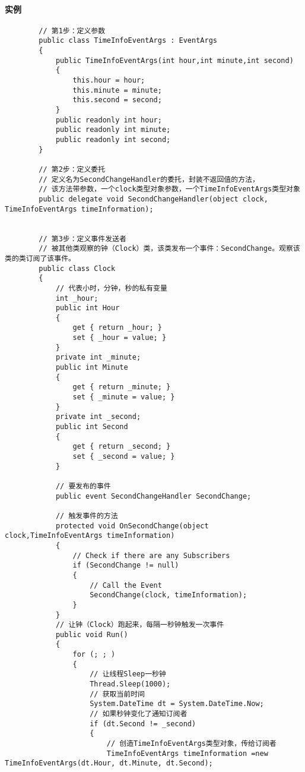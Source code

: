 \documentclass[UTF8,a4paper,12pt]{ctexbook}
\begin{document}
			\paragraph{实例}
				\begin{lstlisting}
		// 第1步：定义参数
	    public class TimeInfoEventArgs : EventArgs
	    {
	        public TimeInfoEventArgs(int hour,int minute,int second)
	        {
	            this.hour = hour;
	            this.minute = minute;
	            this.second = second;
	        }
	        public readonly int hour;
	        public readonly int minute;
	        public readonly int second;
	    }
	
		// 第2步：定义委托
	    // 定义名为SecondChangeHandler的委托，封装不返回值的方法，
	    // 该方法带参数，一个clock类型对象参数，一个TimeInfoEventArgs类型对象
	    public delegate void SecondChangeHandler(object clock, TimeInfoEventArgs timeInformation);
	
		
		// 第3步：定义事件发送者
	    // 被其他类观察的钟（Clock）类，该类发布一个事件：SecondChange。观察该类的类订阅了该事件。
	    public class Clock
	    {
	        // 代表小时，分钟，秒的私有变量
	        int _hour;
	        public int Hour
	        {
	            get { return _hour; }
	            set { _hour = value; }
	        }
	        private int _minute;
	        public int Minute
	        {
	            get { return _minute; }
	            set { _minute = value; }
	        }
	        private int _second;
	        public int Second
	        {
	            get { return _second; }
	            set { _second = value; }
	        }
	        
	        // 要发布的事件
	        public event SecondChangeHandler SecondChange;
	
	        // 触发事件的方法
	        protected void OnSecondChange(object clock,TimeInfoEventArgs timeInformation)
	        {
	            // Check if there are any Subscribers
	            if (SecondChange != null)
	            {
	                // Call the Event
	                SecondChange(clock, timeInformation);
	            }
	        }
	        // 让钟（Clock）跑起来，每隔一秒钟触发一次事件
	        public void Run()
	        {
	            for (; ; )
	            {
	                // 让线程Sleep一秒钟
	                Thread.Sleep(1000);
	                // 获取当前时间
	                System.DateTime dt = System.DateTime.Now;
	                // 如果秒钟变化了通知订阅者
	                if (dt.Second != _second)
	                {
	                    // 创造TimeInfoEventArgs类型对象，传给订阅者
	                    TimeInfoEventArgs timeInformation =new TimeInfoEventArgs(dt.Hour, dt.Minute, dt.Second);
	                    

\end{lstlisting}
\end{document}
